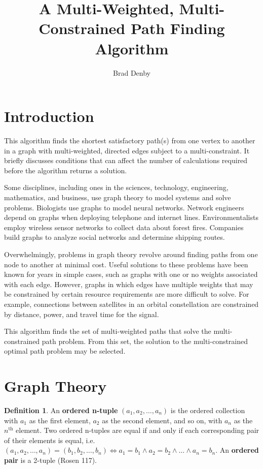 \documentclass[12pt]{amsart}
\theoremstyle{definition}
\newtheorem{definition}[thm]{Definition}
\theoremstyle{remark}
\numberwithin{equation}{section}
\begin{document}
\title{A Multi-Weighted, Multi-Constrained Path Finding Algorithm}

\author{Brad Denby}

\maketitle

\section{Introduction}

This algorithm finds the shortest satisfactory path(s) from one vertex to another in a graph with multi-weighted, directed edges subject to a multi-constraint. It briefly discusses conditions that can affect the number of calculations required before the algorithm returns a solution.

Some disciplines, including ones in the sciences, technology, engineering, mathematics, and business, use graph theory to model systems and solve problems. Biologists use graphs to model neural networks. Network engineers depend on graphs when deploying telephone and internet lines. Environmentalists employ wireless sensor networks to collect data about forest fires. Companies build graphs to analyze social networks and determine shipping routes.

Overwhelmingly, problems in graph theory revolve around finding paths from one node to another at minimal cost. Useful solutions to these problems have been known for years in simple cases, such as graphs with one or no weights associated with each edge. However, graphs in which edges have multiple weights that may be constrained by certain resource requirements are more difficult to solve. For example, connections between satellites in an orbital constellation are constrained by distance, power, and travel time for the signal.

This algorithm finds the set of multi-weighted paths that solve the multi-constrained path problem. From this set, the solution to the multi-constrained optimal path problem may be selected.

\section{Graph Theory}

\begin{definition}
An \textbf{ordered n-tuple} $(a_1, a_2, \ldots, a_n)$ is the ordered collection with $a_1$ as the first element, $a_2$ as the second element, and so on, with $a_n$ as the $n^{\text{th}}$ element. Two ordered n-tuples are equal if and only if each corresponding pair of their elements is equal, i.e. $(a_1, a_2, \ldots, a_n) = (b_1, b_2, \ldots, b_n) \iff a_1 = b_1 \land a_2 = b_2 \land \ldots \land a_n = b_n$. An \textbf{ordered pair} is a 2-tuple (Rosen 117).
\end{definition}
\end{document}
